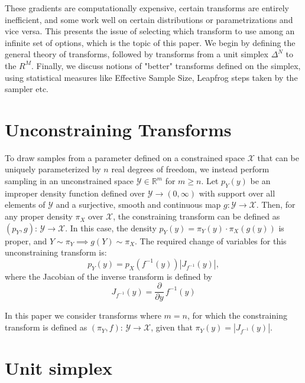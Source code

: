 \documentclass[11pt]{article}
\newcommand{\abs}[1]{\left| #1 \right|}
\newcommand{\absdet}[1]{\abs{#1}}
\begin{document}
These gradients are computationally expensive, certain transforms are entirely inefficient, and some work well on certain distributions or parametrizations and vice versa. This presents the issue of selecting which transform to use
among an infinite set of options, which is the topic of this paper. We begin by defining the general theory of transforms, followed by transforms from a unit simplex $\Delta^N$ to the $R^M$. Finally, we discuss notions of "better" transforms defined on the simplex, using statistical measures like Effective Sample Size, Leapfrog steps taken by the sampler etc.




\section{Unconstraining Transforms}

To draw samples from a parameter defined on a constrained space $\mathcal{X}$ that can be uniquely parameterized by $n$ real degrees of freedom, we instead perform sampling in an unconstrained space $\mathcal{Y} \in \mathbb{R}^m$ for $m \ge n$. Let $p_Y(y)$ be an improper density function defined over $\mathcal{Y} \rightarrow(0, \infty)$ with support over all elements of $\mathcal{Y}$ and a surjective, smooth and continuous map $g: \mathcal{Y} \rightarrow \mathcal{X}$. Then, for any proper density $\pi_{X}$ over $\mathcal{X}$, the constraining transform can be defined as $\left(p_{Y}, g\right)$: $\mathcal{Y} \rightarrow \mathcal{X}$. In this case, the density $p_{Y}(y)=\pi_{Y}(y) \cdot \pi_{X}(g(y))$ is proper, and $Y \sim \pi_Y \implies g(Y) \sim \pi_X$. The required change of variables for this unconstraining transform is:
\[
  p_Y(y) = p_X(f^{-1}(y)) \absdet{J_{f^{-1}}(y)},
\]
where the Jacobian of the inverse transform is defined by
\[
  J_{f^{-1}}(y) = \frac{\partial}{\partial y} \, f^{-1}(y)
\]


In this paper we consider transforms where $m = n$, for which the constraining transform is defined as $(\pi_Y, f)$: $\mathcal{Y} \rightarrow \mathcal{X}$, given that $\pi_{Y}(y)=\absdet{J_{f^{-1}}(y)}$.



\section{Unit simplex}
\end{document}

